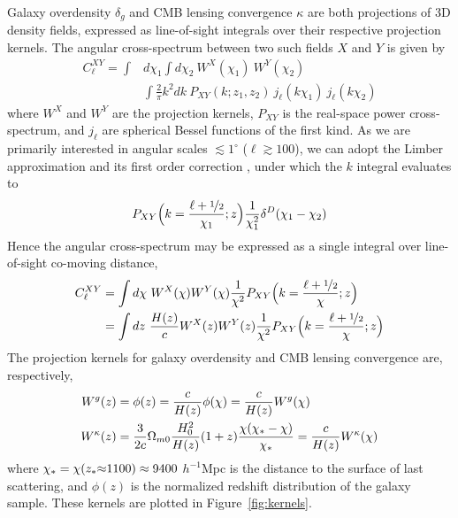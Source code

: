 Galaxy overdensity $\delta_g$ and CMB lensing convergence $\kappa$ are both projections of 3D density fields, expressed as line-of-sight integrals over their respective projection kernels. The angular cross-spectrum between two such fields $X$ and $Y$ is given by
\begin{align}
C_{\ell}^{XY} = \int & d\chi_1 \int d\chi_2 \ W^X(\chi_1) \ W^Y(\chi_2) \nonumber \\ & \int \frac{2}{\pi}k^2dk \ P_{XY}(k;z_1,z_2) \ j_{\ell}(k\chi_1) \ j_{\ell}(k\chi_2)
\end{align}
where $W^X$ and $W^Y$ are the projection kernels, $P_{XY}$ is the real-space power cross-spectrum, and $j_{\ell}$ are spherical Bessel functions of the first kind. As we are primarily interested in angular scales $\lesssim 1^{\circ}$ ($\ell \gtrsim 100$), we can adopt the Limber approximation \citep{Limber53, Rubin54} and its first order correction \citep{LoverdeAfshordi08}, under which the $k$ integral evaluates to
\begin{equation}
    P_{XY}{\Big (}k = \frac{\ell + 
\nicefrac{1}{2}}{\chi_1}; z{\Big )}\frac{1}{\chi_1^2}\delta^{D}(\chi_1 - \chi_2)
\end{equation}
Hence the angular cross-spectrum may be expressed as a single integral over line-of-sight co-moving distance,
\begin{align}
C_{\ell}^{XY} &= \int d\chi \ W^X(\chi) W^Y(\chi) \frac{1}{\chi^2}P_{XY}{\Big (}k = \frac{\ell + 
\nicefrac{1}{2}}{\chi}; z{\Big )} \\
&= \int dz \ \frac{H(z)}{c} W^X(z) W^Y(z) \frac{1}{\chi^2}P_{XY}{\Big (}k = \frac{\ell + 
\nicefrac{1}{2}}{\chi}; z{\Big )}
\end{align}
The projection kernels for galaxy overdensity and CMB lensing convergence are, respectively,
\begin{gather}
\begin{aligned}
    W^{g}(z) &= \phi(z) = \frac{c}{H(z)}\phi(\chi) = \frac{c}{H(z)} W^{g}(\chi) \\
    W^{\kappa}(z) &= \frac{3}{2c} \Omega_{m0} \frac{H_0^2}{H(z)} (1+z) \frac{\chi(\chi_{\rm *}-\chi)}{\chi_{\rm *}} = \frac{c}{H(z)} W^{\kappa}(\chi)
\end{aligned}
\end{gather}
where $\chi_{\rm *} = \chi(z_{\rm *}{\approx}1100) \approx 9400$ $h^{-1}$Mpc is the distance to the surface of last scattering, and $\phi(z)$ is the normalized redshift distribution of the galaxy sample. These kernels are plotted in Figure~\ref{fig:kernels}.

